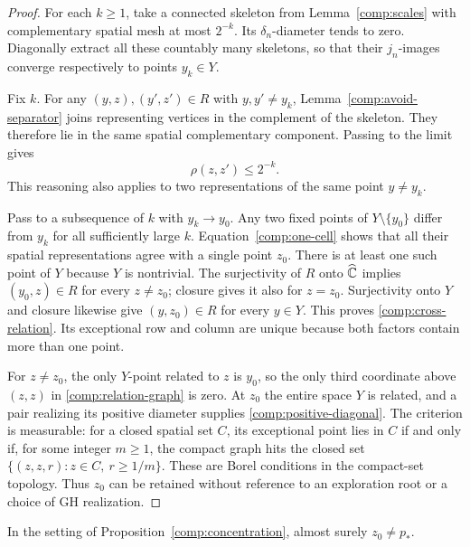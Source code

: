\begin{proof}
For each $k\ge1$, take a connected skeleton from
Lemma~\ref{comp:scales} with complementary spatial mesh at most
$2^{-k}$.  Its $\delta_n$-diameter tends to zero.  Diagonally
extract all these countably many skeletons, so that their
$j_n$-images converge respectively to points $y_k\in Y$.

Fix $k$.  For any $(y,z),(y',z')\in R$ with $y,y'\ne y_k$,
Lemma~\ref{comp:avoid-separator} joins representing vertices in
the complement of the skeleton.  They therefore lie in the same
spatial complementary component.  Passing to the limit gives
\begin{equation}
 \label{comp:one-cell}
 \rho(z,z')\le2^{-k}.
\end{equation}
This reasoning also applies to two representations of the same
point $y\ne y_k$.

Pass to a subsequence of $k$ with $y_k\to y_0$.  Any two fixed
points of $Y\setminus\{y_0\}$ differ from $y_k$ for all sufficiently
large $k$.  Equation~\eqref{comp:one-cell} shows that all their
spatial representations agree with a single point $z_0$.  There
is at least one such point of $Y$ because $Y$ is nontrivial.  The
surjectivity of $R$ onto $\widehat{\mathbb C}$ implies
$(y_0,z)\in R$ for every $z\ne z_0$; closure gives it also for
$z=z_0$.  Surjectivity onto $Y$ and closure likewise give
$(y,z_0)\in R$ for every $y\in Y$.  This proves
\eqref{comp:cross-relation}.  Its exceptional row and column are
unique because both factors contain more than one point.

For $z\ne z_0$, the only $Y$-point related to $z$ is $y_0$, so
the only third coordinate above $(z,z)$ in
\eqref{comp:relation-graph} is zero.  At $z_0$ the entire space $Y$
is related, and a pair realizing its positive diameter supplies
\eqref{comp:positive-diagonal}.  The criterion is measurable:
for a closed spatial set $C$, its exceptional point lies in $C$
if and only if, for some integer $m\ge1$, the compact graph hits
the closed set $\{(z,z,r):z\in C,\ r\ge1/m\}$.  These are Borel
conditions in the compact-set topology.  Thus $z_0$ can be retained
without reference to an exploration root or a choice of GH
realization.
\end{proof}

\begin{lemma}
\label{comp:root-avoidance}
In the setting of Proposition~\ref{comp:concentration}, almost
surely $z_0\ne p_*$.
\end{lemma}


